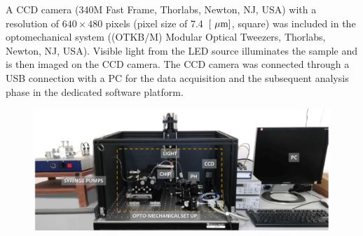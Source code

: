 \documentclass[journal]{IEEEtran}
\theoremstyle{definition}
\theoremstyle{remark}
\begin{document}
A CCD camera (340M Fast Frame, Thorlabs, Newton, NJ, USA) with a resolution of $640 \times 480$ pixels (pixel size of 7.4~$[\rm~\mu m]$, square) was included in the optomechanical system ((OTKB/M) Modular Optical Tweezers, Thorlabs, Newton, NJ, USA). Visible light from the LED source illuminates the sample and is then imaged
on the CCD camera.
The CCD camera was connected through a USB connection with a PC for the data acquisition and the subsequent analysis phase in the dedicated software platform.


\begin{figure}[t]
	\centering
	\includegraphics[width=2\columnwidth]{images/setup}
\end{figure}
\end{document}
